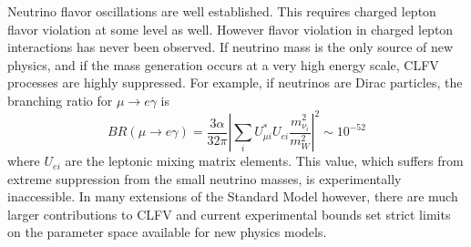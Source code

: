 Neutrino flavor oscillations are well established. This requires charged lepton flavor violation at some level as well.  However flavor violation in charged lepton interactions has never been observed.
If neutrino mass is the only source of new physics, and if
the mass generation occurs at a very high energy scale, CLFV processes are highly suppressed.  For example, if neutrinos are 
Dirac particles, the branching ratio for $\mu\rightarrow e\gamma$ is
\begin{equation}
BR(\mu \rightarrow e \gamma)=\frac{3\alpha}{32\pi}\left|\sum_i U_{\mu
i}^* U_{e i}\frac{m_{\nu_{i}}^2}{m_{W}^2}\right|^2 \sim 10^{-52}
\end{equation}
where $U_{ei}$ are the leptonic mixing matrix elements. This value,
which suffers from extreme suppression from the small neutrino masses,
is experimentally inaccessible. In many extensions of the Standard Model
however, there are much larger contributions to CLFV and current experimental bounds set strict limits on the parameter space available for new physics models.


